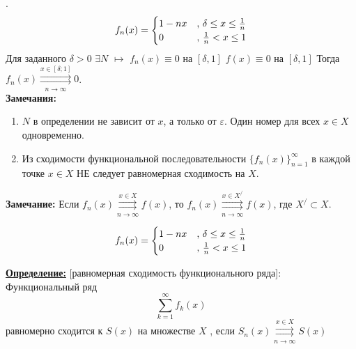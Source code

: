 \documentclass[a4paper,12pt]{article} %
\begin{document}
.\\

\begin{equation*}
f_n(x) = 
 \begin{cases}
   1-nx &\text{, $\delta \leq x \leq {1 \over n}$}\\
   0 &\text{, ${1\over n}< x\leq 1$}
 \end{cases}
\end{equation*}
Для заданного $\delta > 0$ $\exists N$ $\longmapsto$ \newline
\hspace*{40 mm} $f_n(x) \equiv 0$ на $[\delta, 1]$ \newline
\hspace*{40 mm} $f(x) \equiv 0$ на $[\delta, 1]$ \newline
Тогда $f_n(x) \overset{x \in [\delta;1]}{\underset{n \rightarrow \infty}{\rightrightarrows}} 0$.\\


\textbf{Замечания:}\newline

\begin{enumerate}
    \item $N$ в определении не зависит от $x$, а только от $\varepsilon$. Один номер для всех $x \in X$ одновременно.
    
    \item Из сходимости функциональной последовательности $\{f_n(x)\}_{n=1}^\infty$ в каждой точке $x \in X$ НЕ следует равномерная сходимость на $X$.
   
\end{enumerate}

\textbf{Замечание:} Если $f_n(x) \overset{x \in X}{\underset{n \rightarrow \infty}{\rightrightarrows}} f(x)$, то 
$f_n(x) \overset{x \in X^/}{\underset{n \rightarrow \infty}{\rightrightarrows}} f(x)$, где $X^/ \subset X$.

\begin{equation*}
f_n(x) = 
 \begin{cases}
   1-nx &\text{, $\delta \leq x \leq {1 \over n}$}\\
   0 &\text{, ${1\over n}< x\leq 1$}
 \end{cases}
\end{equation*}

\underline{\textbf{Определение:}} [равномерная сходимость функционального ряда]:\newline 
Функциональный ряд $$\sum\limits_{k = 1}^{\infty}  f_k(x)$$ равномерно сходится к $S(x)$ на множестве $X$ , если $S_n(x) \overset{x \in X}{\underset{n \rightarrow \infty}{\rightrightarrows}} S(x)$
\end{document}
